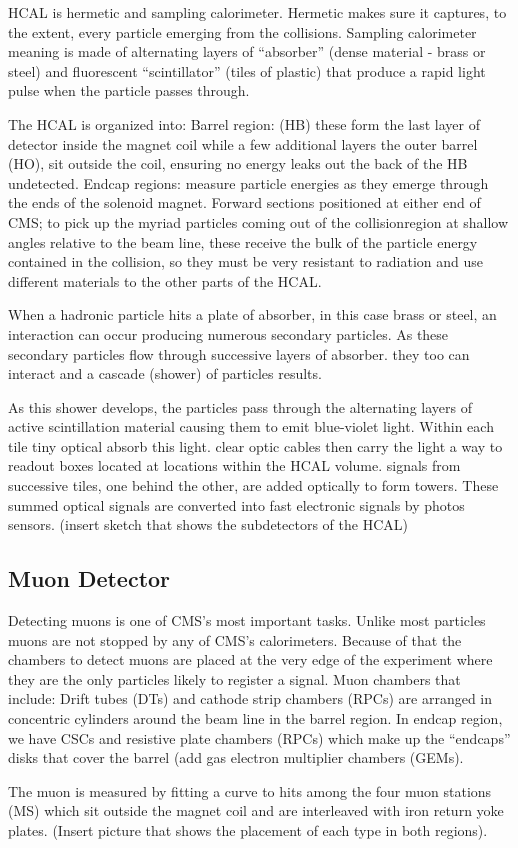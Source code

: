 HCAL is hermetic and sampling calorimeter. Hermetic makes sure it captures, to the extent, every particle emerging from the collisions. Sampling calorimeter meaning is made of alternating layers of “absorber” (dense material - brass or steel) and fluorescent “scintillator” (tiles of plastic) that produce a rapid light pulse when the particle passes through.

The HCAL is organized into:  
Barrel region: (HB) these form the last layer of detector inside the magnet coil while a few additional layers the outer barrel (HO), sit outside the coil, ensuring no energy leaks out the back of the HB undetected.  
Endcap regions: measure particle energies as they emerge through the ends of the solenoid magnet. Forward sections positioned at either end of CMS; to pick up the myriad particles coming out of the collisionregion at shallow angles relative to the beam line, these receive the bulk of the particle energy contained in the collision, so they must be very resistant to radiation and use different materials to the other parts of the HCAL.

When a hadronic particle hits a plate of absorber, in this case brass or steel, an interaction can occur producing numerous secondary particles. As these secondary particles flow through successive layers of absorber.
they too can interact and a cascade (shower) of particles results.

As this shower develops, the particles pass through the alternating layers of active scintillation material causing them to emit blue-violet light. Within each tile tiny optical absorb this light. clear optic cables then carry the light a way to readout boxes located at locations within the HCAL volume. signals from successive tiles, one behind the other, are added optically to form towers. These summed optical signals are converted into fast electronic signals by photos sensors. 
(insert sketch that shows the subdetectors of the HCAL)

\subsection{Muon Detector}
Detecting muons is one of CMS’s most important tasks. Unlike most particles muons are not stopped by any of CMS’s calorimeters. Because of that the chambers to detect muons are placed at the very edge of the experiment where they are the only particles likely to register a signal. Muon chambers that include: Drift tubes (DTs) and cathode strip chambers (RPCs) are arranged in concentric cylinders around the beam line in the barrel region. In endcap region, we have CSCs and resistive plate chambers (RPCs) which make up the “endcaps” disks that cover the barrel (add gas electron multiplier chambers (GEMs).

The muon is measured by fitting a curve to hits among the four muon stations (MS) which sit outside the magnet coil and are interleaved with iron return yoke plates. (Insert picture that shows the placement of each type in both regions). 
